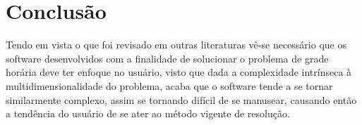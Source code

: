 \chapter{Conclusão}

Tendo em vista o que foi revisado em outras literaturas vê-se necessário que os software desenvolvidos com a finalidade de solucionar o problema de grade horária deve ter enfoque no usuário, visto que dada a complexidade intrínseca à multidimensionalidade do problema, acaba que o software tende a se tornar similarmente complexo, assim se tornando difícil de se manusear, causando então a tendência do usuário de se ater ao método vigente de resolução.